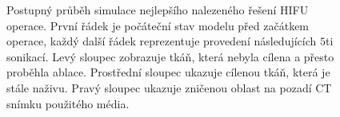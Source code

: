\begin{figure}[H]
    \caption{Postupný průběh simulace nejlepšího nalezeného řešení HIFU operace. První řádek je počáteční stav modelu před začátkem operace, každý další řádek reprezentuje provedení následujících $5$ti sonikací. Levý sloupec zobrazuje tkáň, která nebyla cílena a přesto proběhla ablace. Prostřední sloupec ukazuje cílenou tkáň, která je stále naživu. Pravý sloupec ukazuje zničenou oblast na pozadí CT snímku použitého média.}
    \label{fg:hifu:flower:prog}
\end{figure}